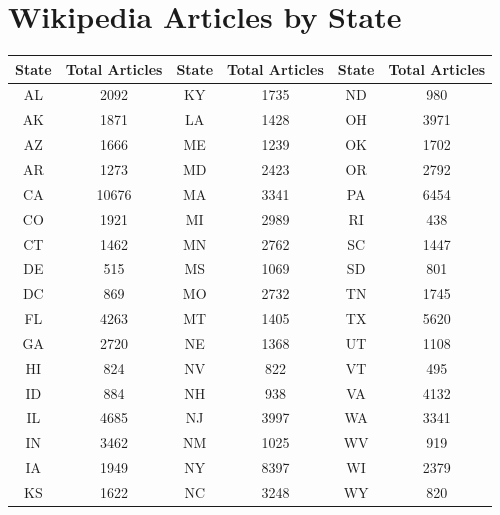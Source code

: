 \documentclass[midd]{thesis}
\begin{document}
\chapter{Wikipedia Articles by State}
  \begin{tabular}{| c | c || c | c || c | c |}
  \hline
\textbf{State} & \textbf{Total Articles} & \textbf{State} & \textbf{Total Articles} & \textbf{State} & \textbf{Total Articles} \\
\hline
AL & 2092 & KY & 1735 & ND & 980 \\
AK & 1871 & LA & 1428 & OH & 3971 \\
AZ & 1666 & ME & 1239 & OK & 1702 \\
AR & 1273 & MD & 2423 & OR & 2792 \\
CA & 10676 & MA & 3341 & PA & 6454 \\
CO & 1921 & MI & 2989 & RI & 438 \\
CT & 1462 & MN & 2762 & SC & 1447 \\
DE & 515 & MS & 1069 & SD & 801 \\
DC & 869 & MO & 2732 & TN & 1745 \\
FL & 4263 & MT & 1405 & TX & 5620 \\
GA & 2720 & NE & 1368 & UT & 1108 \\
HI & 824 & NV & 822 & VT & 495 \\
ID & 884 & NH & 938 & VA & 4132 \\
IL & 4685 & NJ & 3997 & WA & 3341 \\
IN & 3462 & NM & 1025 & WV & 919 \\
IA & 1949 & NY & 8397 & WI & 2379 \\
KS & 1622 & NC & 3248 & WY & 820 \\
\hline
\end{tabular}


\nocite{*}


\end{document}
